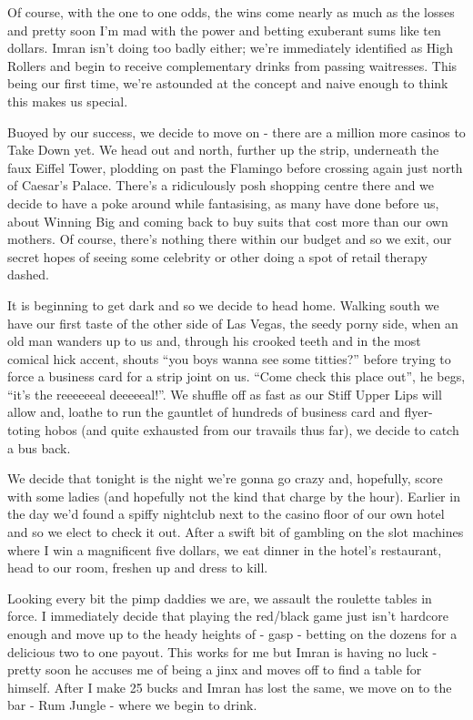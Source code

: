 \documentclass[a5paper,titlepage,11pt,draft]{book}
\begin{document}
Of course, with the one to one odds, the wins come nearly as much as the losses and pretty soon I'm mad with the power and betting exuberant sums like ten dollars.  Imran isn't doing too badly either; we're immediately identified as High Rollers and begin to receive complementary drinks from passing waitresses.  This being our first time, we're astounded at the concept and naive enough to think this makes us special.

Buoyed by our success, we decide to move on - there are a million more casinos to Take Down yet.  We head out and north, further up the strip, underneath the faux Eiffel Tower, plodding on past the Flamingo before crossing again just north of Caesar's Palace.  There's a ridiculously posh shopping centre there and we decide to have a poke around while fantasising, as many have done before us, about Winning Big and coming back to buy suits that cost more than our own mothers.  Of course, there's nothing there within our budget and so we exit, our secret hopes of seeing some celebrity or other doing a spot of retail therapy dashed.

It is beginning to get dark and so we decide to head home.  Walking south we have our first taste of the other side of Las Vegas, the seedy porny side, when an old man wanders up to us and, through his crooked teeth and in the most comical hick accent, shouts ``you boys wanna see some titties?'' before trying to force a business card for a strip joint on us. ``Come check this place out'', he begs, ``it's the reeeeeeal deeeeeal!''.  We shuffle off as fast as our Stiff Upper Lips will allow and, loathe to run the gauntlet of hundreds of business card and flyer-toting hobos (and quite exhausted from our travails thus far), we decide to catch a bus back.

We decide that tonight is the night we're gonna go crazy and, hopefully, score with some ladies (and hopefully not the kind that charge by the hour).  Earlier in the day we'd found a spiffy nightclub next to the casino floor of our own hotel and so we elect to check it out.  After a swift bit of gambling on the slot machines where I win a magnificent five dollars, we eat dinner in the hotel's restaurant, head to our room, freshen up and dress to kill.

Looking every bit the pimp daddies we are, we assault the roulette tables in force.  I immediately decide that playing the red/black game just isn't hardcore enough and move up to the heady heights of - gasp - betting on the dozens for a delicious two to one payout.  This works for me but Imran is having no luck - pretty soon he accuses me of being a jinx and moves off to find a table for himself.  After I make 25 bucks and Imran has lost the same, we move on to the bar - Rum Jungle - where we begin to drink.
\end{document}
